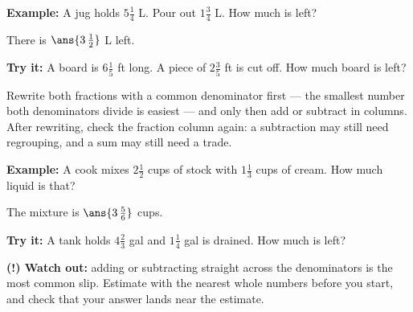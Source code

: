\documentclass[12pt]{article}
\begin{document}
\begin{examplebox}
\textbf{Example:} A jug holds $5\tfrac{1}{4}$ L. Pour out $1\tfrac{3}{4}$ L.
How much is left?

There is $\ans{3\,\tfrac{1}{2}}$ L left.
\end{examplebox}

\begin{tryitbox}
\textbf{Try it:} A board is $6\tfrac{1}{5}$ ft long. A piece of
$2\tfrac{3}{5}$ ft is cut off. How much board is left?\\[2pt]
\end{tryitbox}


\begin{formulabox}
Rewrite both fractions with a common denominator first --- the smallest number
both denominators divide is easiest --- and only then add or subtract in
columns.\\[3pt]
After rewriting, check the fraction column again: a subtraction may still need
regrouping, and a sum may still need a trade.
\end{formulabox}

\begin{examplebox}
\textbf{Example:} A cook mixes $2\tfrac{1}{2}$ cups of stock with
$1\tfrac{1}{3}$ cups of cream. How much liquid is that?

The mixture is $\ans{3\,\tfrac{5}{6}}$ cups.
\end{examplebox}

\begin{tryitbox}
\textbf{Try it:} A tank holds $4\tfrac{2}{3}$ gal and $1\tfrac{1}{4}$ gal is
drained. How much is left?\\[2pt]
\end{tryitbox}

\begin{watchoutbox}
\textbf{(!) Watch out:} adding or subtracting straight across the denominators
is the most common slip. Estimate with the nearest whole numbers before you
start, and check that your answer lands near the estimate.
\end{watchoutbox}
\end{document}
